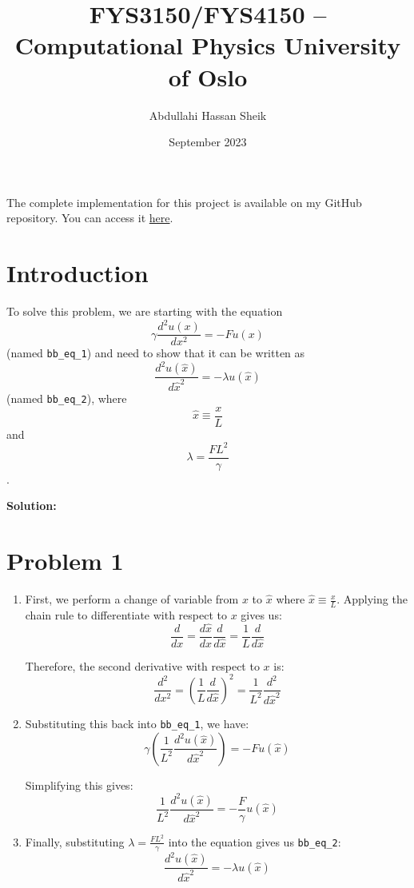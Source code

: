 \documentclass{article}
\title{FYS3150/FYS4150 – Computational Physics University of Oslo}
\author{Abdullahi Hassan Sheik }
\date{September 2023}
\begin{document}
\maketitle

\paragraph{}
The complete implementation for this project is available on my GitHub repository. You can access it \href{https://github.com/SheikAbdullahi/FYS4150Computational-Physics}{here}.

\section{Introduction}

To solve this problem, we are starting with the equation 
\[ \gamma \frac{d^2 u(x)}{dx^2} = - F u(x) \] 
(named \texttt{bb\_eq\_1}) and need to show that it can be written as 
\[ \frac{d^2 u(\hat{x})}{d\hat{x}^2} = - \lambda u(\hat{x}) \] 
(named \texttt{bb\_eq\_2}), where 
\[ \hat{x} \equiv \frac{x}{L} \] 
and 
\[ \lambda = \frac{F L^2}{\gamma} \].

\textbf{Solution:}

\section*{Problem 1}
\begin{enumerate}
    \item First, we perform a change of variable from $x$ to $\hat{x}$ where $\hat{x} \equiv \frac{x}{L}$. Applying the chain rule to differentiate with respect to $x$ gives us:
    \[ \frac{d}{dx} = \frac{d\hat{x}}{dx} \frac{d}{d\hat{x}} = \frac{1}{L} \frac{d}{d\hat{x}} \]
    
    Therefore, the second derivative with respect to $x$ is:
    \[ \frac{d^2}{dx^2} = \left( \frac{1}{L} \frac{d}{d\hat{x}} \right)^2 = \frac{1}{L^2} \frac{d^2}{d\hat{x}^2} \]
    
    \item Substituting this back into \texttt{bb\_eq\_1}, we have:
    \[ \gamma \left( \frac{1}{L^2} \frac{d^2 u(\hat{x})}{d\hat{x}^2} \right) = - F u(\hat{x}) \]
    
    Simplifying this gives:
    \[ \frac{1}{L^2} \frac{d^2 u(\hat{x})}{d\hat{x}^2} = - \frac{F}{\gamma} u(\hat{x}) \]
    
    \item Finally, substituting $\lambda = \frac{F L^2}{\gamma}$ into the equation gives us \texttt{bb\_eq\_2}:
    \[ \frac{d^2 u(\hat{x})}{d\hat{x}^2} = - \lambda u(\hat{x}) \]
\end{enumerate}
\end{document}
